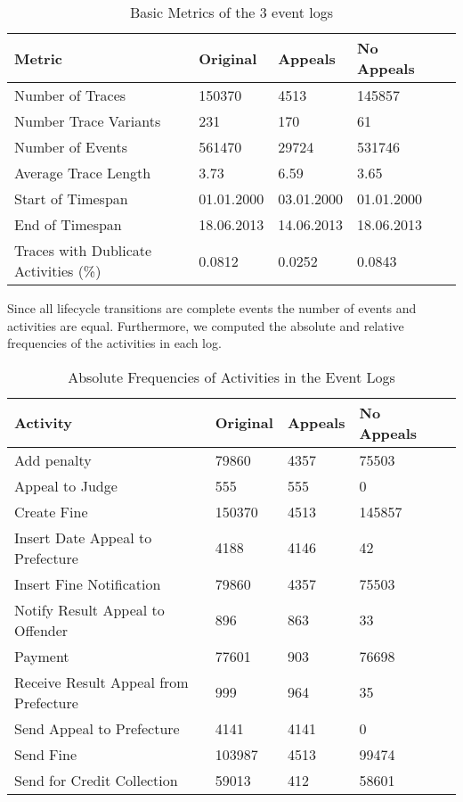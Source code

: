 \documentclass[12pt]{report}
\begin{document}
\begin{table}[H]
\centering
\begin{tabular}{|l|l|l|l|l|}
\hline \textbf{Metric} & \textbf{Original} & \textbf{Appeals} & \textbf{No Appeals} \\
\hline Number of Traces & 150370 & 4513 & 145857\\
\hline Number Trace Variants & 231 & 170 &61\\
\hline Number of Events & 561470 & 29724 & 531746\\
\hline Average Trace Length & 3.73 & 6.59 & 3.65\\
\hline Start of Timespan & 01.01.2000 & 03.01.2000 & 01.01.2000\\
\hline End of Timespan & 18.06.2013 & 14.06.2013 & 18.06.2013\\
\hline Traces with Dublicate Activities (\%)  & 0.0812 & 0.0252 & 0.0843\\
\hline
\end{tabular}
\caption{Basic Metrics of the 3 event logs}
\label{tab:1b}
\end{table}

Since all lifecycle transitions are complete events the number of events and activities are equal. Furthermore, we computed the absolute and relative frequencies of the activities in each log.

\begin{table}[H]
\centering
\begin{tabular}{|l|l|l|l|l|}
\hline \textbf{Activity} & \textbf{Original} & \textbf{Appeals} & \textbf{No Appeals} \\
\hline Add penalty & 79860 & 4357 & 75503\\
\hline Appeal to Judge & 555 & 555 &0\\
\hline Create Fine & 150370 & 4513 & 145857\\
\hline Insert Date Appeal to Prefecture & 4188 & 4146 & 42\\
\hline Insert Fine Notification & 79860 & 4357 & 75503\\
\hline Notify Result Appeal to Offender & 896 & 863 & 33\\
\hline Payment  & 77601 & 903 & 76698\\
\hline Receive Result Appeal from Prefecture & 999 & 964 & 35\\
\hline Send Appeal to Prefecture  & 4141 & 4141 & 0\\
\hline Send Fine  & 103987 & 4513 & 99474\\
\hline Send for Credit Collection & 59013 & 412 & 58601\\
\hline
\end{tabular}
\caption{Absolute Frequencies of Activities in the Event Logs}
\label{tab:1c_absolut}
\end{table}
\end{document}
